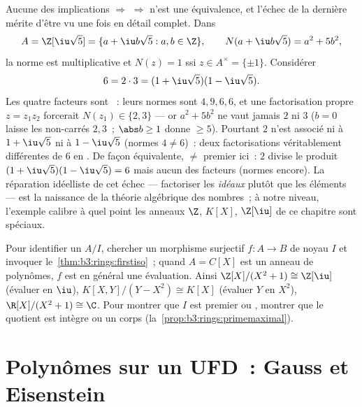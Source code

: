 \begin{example}
\label{ex:b3:rings:nonufd}
Aucune des implications  $\Rightarrow$  $\Rightarrow$
 n'est une équivalence, et l'échec de la dernière mérite d'être
vu une fois en détail complet. Dans
\[
A = \Z[\iu\sqrt5] = \{a + \iu b\sqrt5 : a, b \in \Z\},
\qquad N(a + \iu b\sqrt5) = a^2 + 5b^2,
\]
la norme est multiplicative et $N(z) = 1$ ssi $z \in A^\times =
\{\pm1\}$. Considérer
\[
6 = 2 \cdot 3 = (1 + \iu\sqrt5)(1 - \iu\sqrt5).
\]
Les quatre facteurs sont ~: leurs normes sont $4,
9, 6, 6$, et une factorisation propre $z = z_1z_2$ forcerait
$N(z_1) \in \{2, 3\}$ --- or $a^2 + 5b^2$ ne vaut jamais $2$ ni
$3$ ($b = 0$ laisse les non-carrés $2, 3$~; $\abs b \geq 1$
donne $\geq 5$). Pourtant $2$ n'est associé ni à $1 +
\iu\sqrt5$ ni à $1 - \iu\sqrt5$ (normes $4 \neq 6$)~: deux
factorisations véritablement différentes de $6$ en
. De façon équivalente,  $\neq$
premier ici~: $2$ divise le produit $(1 + \iu\sqrt5)(1 -
\iu\sqrt5) = 6$ mais aucun des facteurs (normes encore). La
réparation idéelliste de cet échec --- factoriser les
\emph{idéaux} plutôt que les éléments --- est la naissance de
la théorie algébrique des nombres~; à notre niveau, l'exemple
calibre à quel point les anneaux  $\Z$, $K[X]$,
$\Z[\iu]$ de ce chapitre sont spéciaux.
\end{example}

\begin{method}\label{met:b3:rings:quotient}
Pour identifier un  $A/I$, chercher un morphisme
surjectif $f \colon A \to B$ de noyau $I$ et invoquer
le~\cref{thm:b3:rings:firstiso}~; quand $A = C[X]$ est un anneau
de polynômes, $f$ est en général une évaluation. Ainsi
$\Z[X]/(X^2+1) \cong \Z[\iu]$ (évaluer en $\iu$), $K[X,Y]/(Y -
X^2) \cong K[X]$ (évaluer $Y$ en $X^2$), $\R[X]/(X^2+1) \cong
\C$. Pour montrer que $I$ est premier ou , montrer que le
quotient est intègre ou un corps
(la~\cref{prop:b3:rings:primemaximal}).
\end{method}

\section{Polynômes sur un UFD~: Gauss et Eisenstein}

